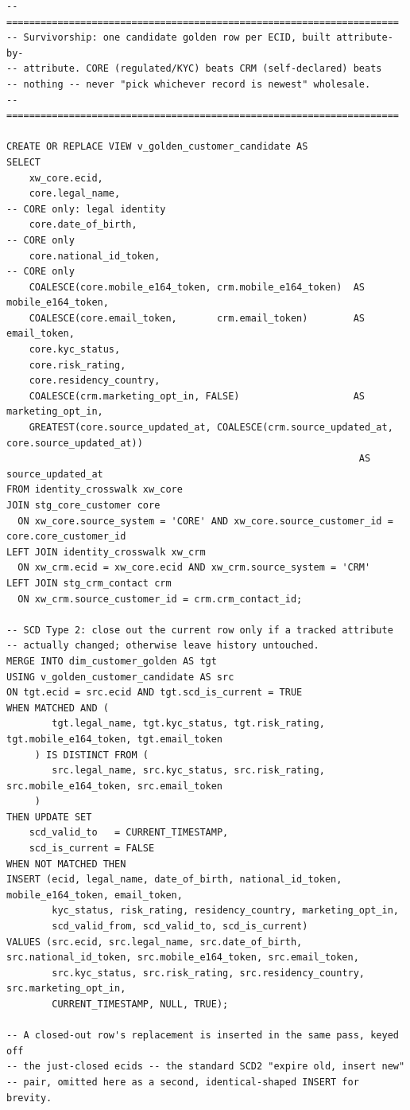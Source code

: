 \documentclass[11pt]{article}
\begin{document}
\begin{lstlisting}[language=PseudoSQL, style=codeblock]
-- =====================================================================
-- Survivorship: one candidate golden row per ECID, built attribute-by-
-- attribute. CORE (regulated/KYC) beats CRM (self-declared) beats
-- nothing -- never "pick whichever record is newest" wholesale.
-- =====================================================================

CREATE OR REPLACE VIEW v_golden_customer_candidate AS
SELECT
    xw_core.ecid,
    core.legal_name,                                                   -- CORE only: legal identity
    core.date_of_birth,                                                -- CORE only
    core.national_id_token,                                            -- CORE only
    COALESCE(core.mobile_e164_token, crm.mobile_e164_token)  AS mobile_e164_token,
    COALESCE(core.email_token,       crm.email_token)        AS email_token,
    core.kyc_status,
    core.risk_rating,
    core.residency_country,
    COALESCE(crm.marketing_opt_in, FALSE)                    AS marketing_opt_in,
    GREATEST(core.source_updated_at, COALESCE(crm.source_updated_at, core.source_updated_at))
                                                              AS source_updated_at
FROM identity_crosswalk xw_core
JOIN stg_core_customer core
  ON xw_core.source_system = 'CORE' AND xw_core.source_customer_id = core.core_customer_id
LEFT JOIN identity_crosswalk xw_crm
  ON xw_crm.ecid = xw_core.ecid AND xw_crm.source_system = 'CRM'
LEFT JOIN stg_crm_contact crm
  ON xw_crm.source_customer_id = crm.crm_contact_id;

-- SCD Type 2: close out the current row only if a tracked attribute
-- actually changed; otherwise leave history untouched.
MERGE INTO dim_customer_golden AS tgt
USING v_golden_customer_candidate AS src
ON tgt.ecid = src.ecid AND tgt.scd_is_current = TRUE
WHEN MATCHED AND (
        tgt.legal_name, tgt.kyc_status, tgt.risk_rating, tgt.mobile_e164_token, tgt.email_token
     ) IS DISTINCT FROM (
        src.legal_name, src.kyc_status, src.risk_rating, src.mobile_e164_token, src.email_token
     )
THEN UPDATE SET
    scd_valid_to   = CURRENT_TIMESTAMP,
    scd_is_current = FALSE
WHEN NOT MATCHED THEN
INSERT (ecid, legal_name, date_of_birth, national_id_token, mobile_e164_token, email_token,
        kyc_status, risk_rating, residency_country, marketing_opt_in,
        scd_valid_from, scd_valid_to, scd_is_current)
VALUES (src.ecid, src.legal_name, src.date_of_birth, src.national_id_token, src.mobile_e164_token, src.email_token,
        src.kyc_status, src.risk_rating, src.residency_country, src.marketing_opt_in,
        CURRENT_TIMESTAMP, NULL, TRUE);

-- A closed-out row's replacement is inserted in the same pass, keyed off
-- the just-closed ecids -- the standard SCD2 "expire old, insert new"
-- pair, omitted here as a second, identical-shaped INSERT for brevity.
\end{lstlisting}
\end{document}
